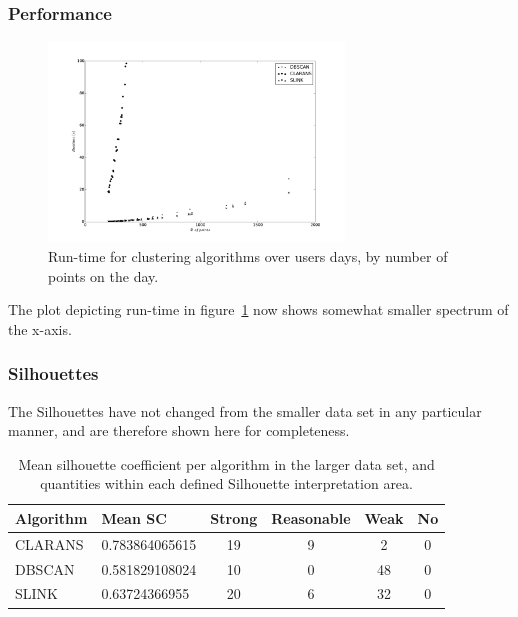 \subsubsection{Performance}

\begin{figure}[ht]
    \centering
    \includegraphics[width=0.7\textwidth]{plots/days_runtime_scatter.pdf}
    \caption{Run-time for clustering algorithms over users days, by number of
        points on the day.
    \label{fig:day-runtime-scatter} }
\end{figure}

The plot depicting run-time in figure~\ref{fig:day-runtime-scatter} now 
shows somewhat smaller spectrum of the x-axis.

\clearpage

\subsubsection{Silhouettes}

The Silhouettes have not changed from the smaller data set in any particular
manner, and are therefore shown here for completeness.

\begin{table}
    \centering
    {\begin{tabular}{ | l | l | c c c c | }
        \hline
        Algorithm & Mean SC & Strong & Reasonable & Weak & No  \\
        \hline
        CLARANS & 0.783864065615 & 19 & 9 & 2  & 0  \\
        DBSCAN  & 0.581829108024 & 10 & 0 & 48 & 0  \\
        SLINK   & 0.63724366955  & 20 & 6 & 32 & 0  \\
        \hline
    \end{tabular}}
    \caption{Mean silhouette coefficient per algorithm in the larger data set, and
        quantities within each defined Silhouette interpretation area.} 
    \label{table:days-mean-silhouette}
\end{table}

